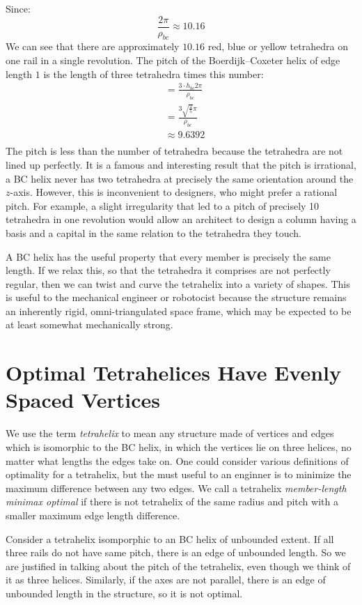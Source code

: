 \documentclass[11pt]{article}
\begin{document}
Since:
\[ \frac{2 \pi}{\rho_{bc}} \approx 10.16
\]
We can see that there are approximately $10.16$ red, blue or yellow tetrahedra on one rail in a single revolution.
The pitch of the Boerdijk--Coxeter helix of edge length $1$ is the length of three tetrahedra times this number:
\begin{align*}
  &= \frac{3 \cdot h_{bc} 2 \pi }{\rho_{bc}} \\
  &= \frac{3  \sqrt{\frac{2}{5}}  \pi}{\rho_{bc}} \\
  &\approx 9.6392 \\
\end{align*}
The pitch is less than the number of tetrahedra because the tetrahedra are not lined up perfectly.
It is a famous and interesting result that the pitch is irrational, a BC helix never has two tetrahedra
at precisely the same orientation around the $z$-axis. However, this is inconvenient to designers, who
might prefer a rational pitch. For example, a slight irregularity that led to a pitch of precisely 10 tetrahedra
in one revolution would allow an architect to design a column having a basis and a capital in the same relation to the tetrahedra
they touch.

A BC helix has the useful property that every member is precisely the same length. If we relax this, so that the tetrahedra it
comprises are not perfectly regular, then we can twist and curve the tetrahelix into a variety of shapes. This is useful to
the mechanical engineer or robotocist because the structure remains an inherently rigid, omni-triangulated space frame, which
may be expected to be at least somewhat mechanically strong.

\section{Optimal Tetrahelices Have Evenly Spaced Vertices}

We use the term \emph{tetrahelix} to mean any structure made of vertices and edges which is isomorphic to the BC helix,
in which the vertices lie on three helices, 
no matter what lengths the edges take on. One could consider various definitions of optimality for a tetrahelix,
but the must useful to an enginner is to minimize the maximum difference between any two edges. We call a
tetrahelix \emph{member-length minimax optimal} if there is not tetrahelix of the same radius and pitch with a smaller
maximum edge length difference.

Consider a tetrahelix isomporphic to an BC helix of unbounded extent. If all three rails do not have same pitch, there
is an edge of unbounded length. So we are justified in talking about the pitch of the tetrahelix, even though we think
of it as three helices. Similarly, if the axes are not parallel, there is an edge of unbounded length in the structure,
so it is not optimal.
\end{document}
